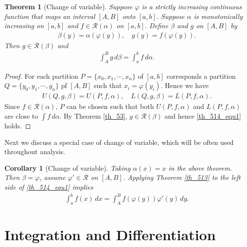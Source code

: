 \documentclass[10pt]{book}
\newtheorem{theorem}{Theorem}[chapter]
\newtheorem{corollary}{Corollary}[theorem]
\theoremstyle{definition}
\numberwithin{equation}{chapter}
\begin{document}
\medskip

\begin{theorem}[Change of variable]\label{th_514}
Suppose $\varphi$ is a strictly increasing continuous function that maps an interval $[A,B]$ onto $[a,b]$. Suppose $\alpha$ is monotonically increasing on $[a,b]$ and $f \in \mathscr{R}(\alpha)$ on $[a,b]$. Define $\beta$ and $g$ on $[A,B]$ by 
\begin{align*}
    \beta(y) = \alpha(\varphi(y)), \quad g(y) = f(\varphi(y)).
\end{align*}
Then $g \in \mathscr{R}(\beta)$ and
\begin{align}\label{th_514_equ1}
    \int^B_A g \,d\beta = \int^b_a f \,d\alpha.
\end{align}
\end{theorem}
\begin{proof}
For each partition $P = \{x_0,x_1,\cdots,x_n\}$ of $[a,b]$ corresponds a partition $Q = \{y_0,y_1,\cdots,y_n\}$ pf $[A,B]$ such that $x_i = \varphi(y_i)$. Hence we have
\begin{align*}
    U(Q,g,\beta) = U(P,f,\alpha),  \quad L(Q,g,\beta) = L(P,f,\alpha).
\end{align*}
Since $f \in \mathscr{R}(\alpha)$, $P$ can be chosen such that both $U(P,f,\alpha)$ and $L(P,f,\alpha)$ are close to $\int f \,d\alpha$. By Theorem \ref{th_53}, $g \in \mathscr{R}(\beta)$ and hence \eqref{th_514_equ1} holds.
\end{proof}

\medskip

Next we discuss a special case of change of variable, which will be often used throughout analysis.

\medskip

\begin{corollary}[Change of variable]\label{coro_5141}
Taking $\alpha(x) = x$ in the above theorem. Then $\beta = \varphi$, assume $\varphi' \in \mathscr{R}$ on $[A,B]$. Applying Theorem \ref{th_513} to the left side of \eqref{th_514_equ1} implies
\begin{align*}
    \int^b_a f(x) \,dx = \int^B_A f(\varphi(y)) \varphi'(y) \,dy.
\end{align*}
\end{corollary}

\medskip



\section{Integration and Differentiation}
\end{document}
